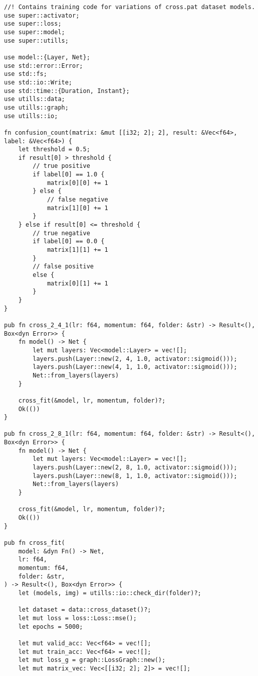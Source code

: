 \begin{verbatim}
//! Contains training code for variations of cross.pat dataset models.
use super::activator;
use super::loss;
use super::model;
use super::utills;

use model::{Layer, Net};
use std::error::Error;
use std::fs;
use std::io::Write;
use std::time::{Duration, Instant};
use utills::data;
use utills::graph;
use utills::io;

fn confusion_count(matrix: &mut [[i32; 2]; 2], result: &Vec<f64>, label: &Vec<f64>) {
    let threshold = 0.5;
    if result[0] > threshold {
        // true positive
        if label[0] == 1.0 {
            matrix[0][0] += 1
        } else {
            // false negative
            matrix[1][0] += 1
        }
    } else if result[0] <= threshold {
        // true negative
        if label[0] == 0.0 {
            matrix[1][1] += 1
        }
        // false positive
        else {
            matrix[0][1] += 1
        }
    }
}

pub fn cross_2_4_1(lr: f64, momentum: f64, folder: &str) -> Result<(), Box<dyn Error>> {
    fn model() -> Net {
        let mut layers: Vec<model::Layer> = vec![];
        layers.push(Layer::new(2, 4, 1.0, activator::sigmoid()));
        layers.push(Layer::new(4, 1, 1.0, activator::sigmoid()));
        Net::from_layers(layers)
    }

    cross_fit(&model, lr, momentum, folder)?;
    Ok(())
}

pub fn cross_2_8_1(lr: f64, momentum: f64, folder: &str) -> Result<(), Box<dyn Error>> {
    fn model() -> Net {
        let mut layers: Vec<model::Layer> = vec![];
        layers.push(Layer::new(2, 8, 1.0, activator::sigmoid()));
        layers.push(Layer::new(8, 1, 1.0, activator::sigmoid()));
        Net::from_layers(layers)
    }

    cross_fit(&model, lr, momentum, folder)?;
    Ok(())
}

pub fn cross_fit(
    model: &dyn Fn() -> Net,
    lr: f64,
    momentum: f64,
    folder: &str,
) -> Result<(), Box<dyn Error>> {
    let (models, img) = utills::io::check_dir(folder)?;

    let dataset = data::cross_dataset()?;
    let mut loss = loss::Loss::mse();
    let epochs = 5000;

    let mut valid_acc: Vec<f64> = vec![];
    let mut train_acc: Vec<f64> = vec![];
    let mut loss_g = graph::LossGraph::new();
    let mut matrix_vec: Vec<[[i32; 2]; 2]> = vec![];


\end{verbatim}
